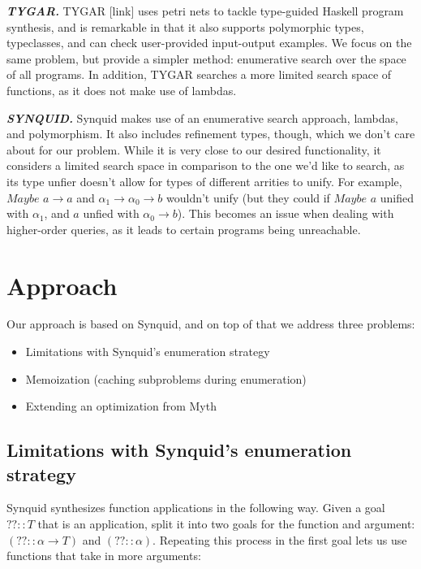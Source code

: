 \documentclass[acmsmall,nonacm]{acmart}
\begin{document}
\vspace{2mm}
\noindent \textbf{\textit{TYGAR.}} TYGAR [link] uses petri nets to 
tackle type-guided Haskell program synthesis, and is remarkable in that 
it also supports polymorphic types, typeclasses, and can check 
user-provided input-output examples. We focus on the same problem, but 
provide a simpler method: enumerative search over the space of all programs. 
In addition, TYGAR searches a more limited search space of functions, as 
it does not make use of lambdas.


\vspace{2mm}
\noindent \textbf{\textit{SYNQUID.}} Synquid makes 
use of an enumerative search approach, lambdas, and polymorphism. It also
includes refinement types, though, which we don't care about for our problem. 
While it is very close to our desired functionality, it considers a limited search 
space in comparison to the one we'd like to search, as its type unfier doesn't allow 
for types of different arrities to unify. For example, ${Maybe}$ ${a \to a}$ 
and ${\alpha_1 \to \alpha_0 \to b}$ wouldn't unify (but they could if $Maybe$ $a$
unified with $\alpha_1$, and $a$ unfied with $\alpha_0 \to b$). 
This becomes an issue when dealing with higher-order queries, as it leads
to certain programs being unreachable.




\section{Approach}
\label{approach}

Our approach is based on Synquid, and on top of that we address three problems:

\begin{itemize}
\item Limitations with Synquid's enumeration strategy
\item Memoization (caching subproblems during enumeration)
\item Extending an optimization from Myth
\end{itemize}

\subsection{Limitations with Synquid's enumeration strategy}

Synquid synthesizes function applications in the following way. 
Given a goal $?? :: T$ that is an application, split it into two 
goals for the function and argument: $(?? :: \alpha \to T)$ and 
$(?? :: \alpha)$. Repeating this process in the first goal lets us 
use functions that take in more arguments:
\end{document}
